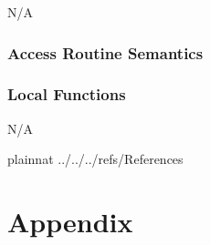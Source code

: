 \documentclass[12pt, titlepage]{article}
\begin{document}
N/A

\subsubsection{Access Routine Semantics}


\subsubsection{Local Functions}

N/A

\newpage



 {plainnat}
 {../../../refs/References}

\newpage

\section{Appendix} \label{Appendix}

\end{document}
